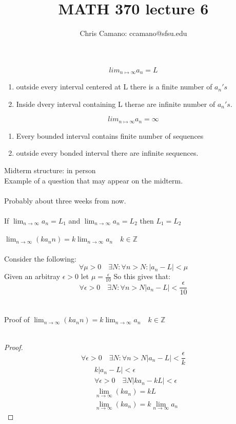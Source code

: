 \documentclass[11pt]{article}
\author{Chris Camano: ccamano@sfsu.edu}
\title{MATH 370  lecture 6 }
\date
\theoremstyle{definition}  %
\newcommand{\Z}{\mathbb{Z}}
\begin{document}
\maketitle
\[
  lim_{n\mapsto \infty}a_n=L
\]
\begin{enumerate}
  \item outside every interval centered at L there is a finite number of $a_n's$
  \item Inside dvery interval containing L therae are infinite number of $a_n's$.
\end{enumerate}
\[
  lim_{n\mapsto \infty}a_n =\infty
\]
\begin{enumerate}
  \item Every bounded interval contains finite number of sequences
  \item outside every bonded interval there  are infinite sequences.
\end{enumerate}
Midterm structure: in person\\
Example of a question that may appear on the midterm. \\\\
Probably about three weeks from now.
\\\\
\newcommand{\nlim}{\lim_{n\rightarrow\infty}}
If  $\nlim a_n=L_1$ and $\nlim a_n=L_2$ then $L_1=L_2$\\\\
 $\nlim(ka_nn)=k\nlim a_n\quad k\in \Z$\\\\
Consider the following:
\newcommand{\eps}{\epsilon}
\[
   \forall \mu >0 \quad\exists N : \forall n>N : |a_n-L|<\mu
\]
Given an arbitray $\eps >0 $ let $\mu =\frac{\eps}{10}$
So this gives that:
\[
  \forall \eps >0\quad  \exists N : \forall n>N |a_n-L|<\frac{\eps}{10}
\]
\\\\
Proof of  $\nlim(ka_nn)=k\nlim a_n\quad k\in \Z$\\\\
\begin{proof}
  \[
    \forall \eps >0 \quad\exists N : \forall n>N |a_n-L|<\frac{\eps}{k}
  \]
\begin{align*}
  &k|a_n-L|<\eps\\
  &\forall \eps >0\quad  \exists N  |ka_n-kL|<\eps\\
  &\nlim (ka_n)=kL\\
  &\nlim (ka_n)=k\nlim a_n
\end{align*}
\end{proof}
\end{document}
